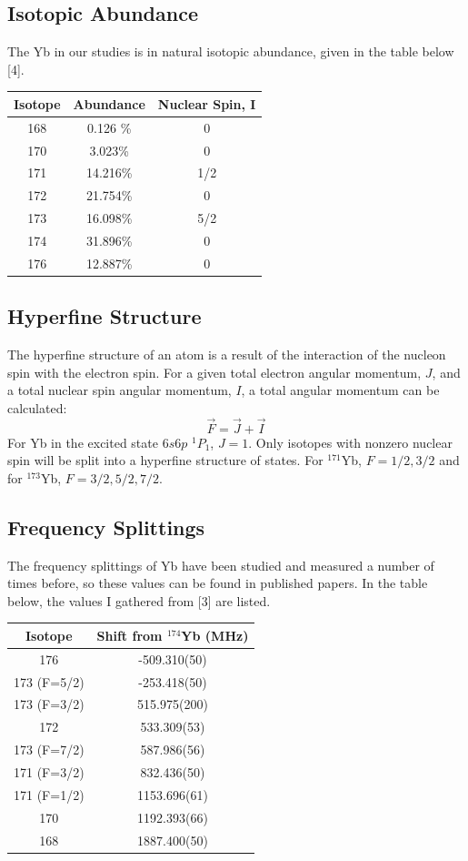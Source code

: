 \documentclass[12pt, a4paper]{article}
\begin{document}
\subsection{Isotopic Abundance}
The Yb in our studies is in natural isotopic abundance, given in the table below [4].
\begin{center}
\begin{tabular}{||c|c|c||}
\hline
\bf{Isotope} & \bf{Abundance} & \bf{Nuclear Spin, I}\\
\hline 
168 & 0.126 \% & 0\\
\hline
170 & 3.023\% & 0 \\
\hline
171 & 14.216\% & 1/2 \\
\hline
172 & 21.754\% & 0 \\
\hline
173 & 16.098\% & 5/2 \\
\hline
174 & 31.896\% & 0 \\
\hline
176 & 12.887\% & 0 \\
\hline
\end{tabular}
\end{center}
\subsection{Hyperfine Structure}
The hyperfine structure of an atom is a result of the interaction of the nucleon spin with the electron spin. For a given total electron angular momentum, $J$, and a total nuclear spin angular momentum, $I$, a total angular momentum can be calculated:
\begin{equation}
\vec{F} = \vec{J} +\vec{I}
\end{equation}
For Yb in the excited state $6s6p$ $^{1}P_{1}$, $J=1$. Only isotopes with nonzero nuclear spin will be split into a hyperfine structure of states. For $^{171}$Yb, $F=1/2,3/2$ and for $^{173}$Yb, $F=3/2,5/2,7/2$.
\subsection{Frequency Splittings}
The frequency splittings of Yb have been studied and measured a number of times before, so these values can be found in published papers. In the table below, the values I gathered from [3] are listed.
\begin{center}
\begin{tabular}{||c|c||}
\hline
\bf{Isotope} & \bf{Shift from $^{174}$Yb (MHz)}\\
\hline
176 & -509.310(50) \\
\hline
173 (F=5/2) & -253.418(50) \\
\hline
173 (F=3/2) & 515.975(200) \\
\hline
172 & 533.309(53) \\
\hline
173 (F=7/2) & 587.986(56) \\
\hline
171 (F=3/2) & 832.436(50) \\
\hline
171 (F=1/2) & 1153.696(61) \\
\hline
170 & 1192.393(66) \\
\hline
168 & 1887.400(50) \\
\hline
\end{tabular}
\end{center}
\end{document}
